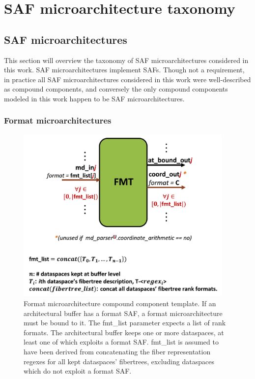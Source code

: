 \chapter{SAF microarchitecture taxonomy}
\label{chapter:saf_microarchitectures}

\section{SAF microarchitectures}
\label{chapter:saf_microarchitectures_section}

This section will overview the taxonomy of SAF microarchitectures considered in this work. SAF microarchitectures implement SAFs. Though not a requirement, in practice all SAF microarchitectures considered in this work were well-described as compound components, and conversely the only compound components modeled in this work happen to be SAF microarchitectures.

\subsection{Format microarchitectures}

\begin{figure}[H]
    \centering
    \includegraphics[width=0.95\textwidth]{figures/FMT.png}
    \caption{Format microarchitecture compound component template. If an architectural buffer has a format SAF, a format microarchitecture must be bound to it. The fmt\_list parameter expects a list of rank formats. The architectural buffer keeps\cite{timeloop} one or more dataspaces\cite{timeloop}, at least one of which exploits a format SAF. fmt\_list is assumed to have been derived from concatenating the fiber representation regexes\cite{szebook} for all kept dataspaces' fibertrees, excluding dataspaces which do not exploit a format SAF.}
    \label{fig:FMT}
\end{figure}

